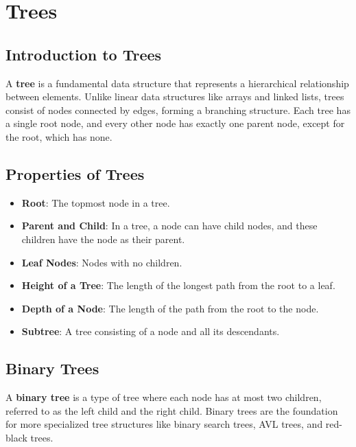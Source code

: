 
\chapter{Trees}

\section{Introduction to Trees}

A \textbf{tree} is a fundamental data structure that represents a hierarchical relationship between elements. Unlike linear data structures like arrays and linked lists, trees consist of nodes connected by edges, forming a branching structure. Each tree has a single root node, and every other node has exactly one parent node, except for the root, which has none.

\section{Properties of Trees}

\begin{itemize}
    \item \textbf{Root}: The topmost node in a tree.
    \item \textbf{Parent and Child}: In a tree, a node can have child nodes, and these children have the node as their parent.
    \item \textbf{Leaf Nodes}: Nodes with no children.
    \item \textbf{Height of a Tree}: The length of the longest path from the root to a leaf.
    \item \textbf{Depth of a Node}: The length of the path from the root to the node.
    \item \textbf{Subtree}: A tree consisting of a node and all its descendants.
\end{itemize}

\section{Binary Trees}

A \textbf{binary tree} is a type of tree where each node has at most two children, referred to as the left child and the right child. Binary trees are the foundation for more specialized tree structures like binary search trees, AVL trees, and red-black trees.

